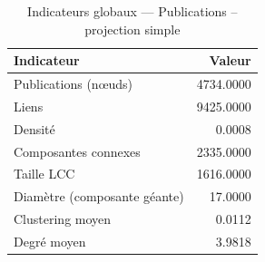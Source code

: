 \begin{table}
\caption{Indicateurs globaux — Publications – projection simple}
\label{tab:global_result_pub_simple}
\begin{tabular}{lr}
\toprule
Indicateur & Valeur \\
\midrule
Publications (nœuds) & 4734.0000 \\
Liens & 9425.0000 \\
Densité & 0.0008 \\
Composantes connexes & 2335.0000 \\
Taille LCC & 1616.0000 \\
Diamètre (composante géante) & 17.0000 \\
Clustering moyen & 0.0112 \\
Degré moyen & 3.9818 \\
\bottomrule
\end{tabular}
\end{table}
